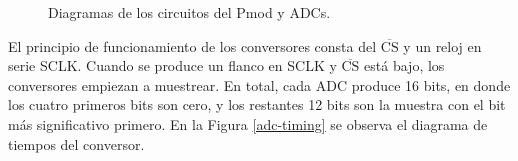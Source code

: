 \begin{figure}[hbt!]
    \centering
    \hspace{10mm}
    \caption{Diagramas de los circuitos del Pmod y ADCs.}
    \label{diagramas-adc}
\end{figure}

El principio de funcionamiento de los conversores consta del $\overline{\mbox{CS}}$ y un reloj en serie SCLK. Cuando se produce un flanco en SCLK y $\overline{\mbox{CS}}$ está bajo, los conversores empiezan a muestrear. En total, cada ADC produce 16 bits, en donde los cuatro primeros bits son cero, y los restantes 12 bits son la muestra con el bit más significativo primero. En la Figura \ref{adc-timing} se observa el diagrama de tiempos del conversor.

